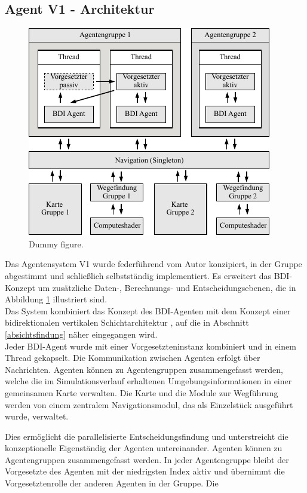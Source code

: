 \documentclass[runningheads]{llncs}
\begin{document}
\subsection{Agent V1 - Architektur}\label{agentV1}
\begin{figure}
\includegraphics{./Referenzen/Architekturdiagramm.pdf}
\caption{Dummy figure.}
\label{g3:architecture}
\end{figure}
Das Agentensystem V1 wurde federführend vom Autor konzipiert, in der Gruppe abgestimmt und schließlich selbstständig implementiert. Es erweitert das BDI-Konzept \cite{Bratman1987} um zusätzliche Daten-, Berechnungs- und Entscheidungsebenen, die in Abbildung \ref{g3:architecture} illustriert sind. \\
Das System kombiniert das Konzept des BDI-Agenten mit dem Konzept einer bidirektionalen vertikalen Schichtarchitektur \cite[S. 61-62]{Weiss2000}, auf die in Abschnitt
\ref{absichtsfindung} näher eingegangen wird. \\
Jeder BDI-Agent wurde mit einer Vorgesetzteninstanz kombiniert und in einem Thread gekapselt. Die Kommunikation zwischen Agenten erfolgt über Nachrichten. Agenten können zu Agentengruppen zusammengefasst werden, welche die im Simulationsverlauf erhaltenen Umgebungsinformationen in einer gemeinsamen Karte verwalten. Die Karte und die Module zur Wegführung werden von einem zentralem Navigationsmodul, das als Einzelstück ausgeführt wurde, verwaltet. 



 Dies ermöglicht die parallelisierte Entscheidungsfindung und unterstreicht die konzeptionelle Eigenständig der Agenten untereinander. Agenten können zu Agentengruppen zusammengefasst werden. In jeder Agentengruppe bleibt der Vorgesetzte des Agenten mit der niedrigsten Index aktiv und übernimmt die Vorgesetztenrolle der anderen Agenten in der Gruppe. Die  
\end{document}
